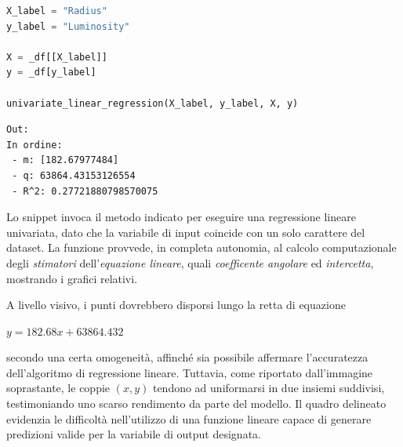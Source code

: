 \documentclass{article}
\begin{document}
    \begin{lstlisting}[language=Python]
X_label = "Radius" 
y_label = "Luminosity"

X = _df[[X_label]]
y = _df[y_label]

univariate_linear_regression(X_label, y_label, X, y)
    \end{lstlisting}
    \begin{lstlisting}[style=Jupyter]
Out: 
In ordine: 
 - m: [182.67977484] 
 - q: 63864.43153126554 
 - R^2: 0.27721880798570075
    \end{lstlisting}
    Lo snippet invoca il metodo indicato per eseguire una regressione lineare univariata, dato che la variabile di input coincide con un solo carattere del dataset. La funzione provvede, in completa autonomia, al calcolo computazionale degli \textit{stimatori} dell'\textit{equazione lineare}, quali \textit{coefficente angolare} ed \textit{intercetta}, mostrando i grafici relativi.
    \begin{center}
    \end{center}
    A livello visivo, i punti dovrebbero disporsi lungo la retta di equazione
    \begin{center}
        $y=182.68x + 63864.432$ 
    \end{center}
    secondo una certa omogeneità, affinché sia possibile affermare l'accuratezza dell'algoritmo di regressione lineare. Tuttavia, come riportato dall'immagine soprastante, le coppie $(x,y)$ tendono ad uniformarsi in due insiemi suddivisi, testimoniando uno scarso rendimento da parte del modello. Il quadro delineato evidenzia le difficoltà nell'utilizzo di una funzione lineare capace di generare predizioni valide per la variabile di output designata. \vspace*{7pt}\\
\end{document}
